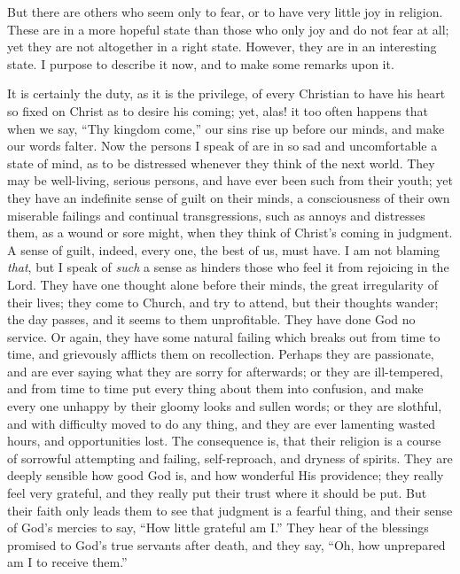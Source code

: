 But there are others who seem only to fear, or to have very little
joy in religion. These are in a more hopeful state than those who only
joy and do not fear at all; yet they are not altogether in a right
state. However, they are in an interesting state. I purpose to
describe it now, and to make some remarks upon it.

It is certainly the duty, as it is the privilege, of every
Christian to have his heart so fixed on Christ as to desire his
coming; yet, alas! it too often happens that when we say, ``Thy
kingdom come,'' our sins rise up before our minds, and make our
words falter. Now the persons I speak of are in so sad and
uncomfortable a state of mind, as to be distressed whenever they think
of the next world. They may be well-living, serious persons, and have
ever been such from their youth; yet they have an indefinite sense of
guilt on their minds, a consciousness of their own miserable failings
and continual transgressions, such as annoys and distresses them, as a
wound or sore might, when they think of Christ's coming in judgment. A
sense of guilt, indeed, every one, the best of us, must have. I am not
blaming \emph{that}, but I speak of \emph{such} a sense as hinders
those who feel it from rejoicing in the Lord. They have one thought
alone before their minds, the great irregularity of their lives; they
come to Church, and try to attend, but their thoughts wander; the day
passes, and it seems to them unprofitable. They have done God no
service. Or again, they have some natural failing which breaks out
from time to time, and grievously afflicts them on recollection.
Perhaps they are passionate, and are ever saying what they are sorry
for afterwards; or they are ill-tempered, and from time to time put
every thing about them into confusion, and make every one unhappy by
their gloomy looks and sullen words; or they are slothful, and with
difficulty moved to do any thing, and they are ever lamenting wasted
hours, and opportunities lost. The consequence is, that their religion
is a course of sorrowful attempting and failing, self-reproach, and
dryness of spirits. They are deeply sensible how good God is, and how
wonderful His providence; they really feel very grateful, and they
really put their trust where it should be put. But their faith only
leads them to see that judgment is a fearful thing, and their sense of
God's mercies to say, ``How little grateful am I.'' They hear
of the blessings promised to God's true servants after death, and they
say, ``Oh, how unprepared am I to receive them.''

